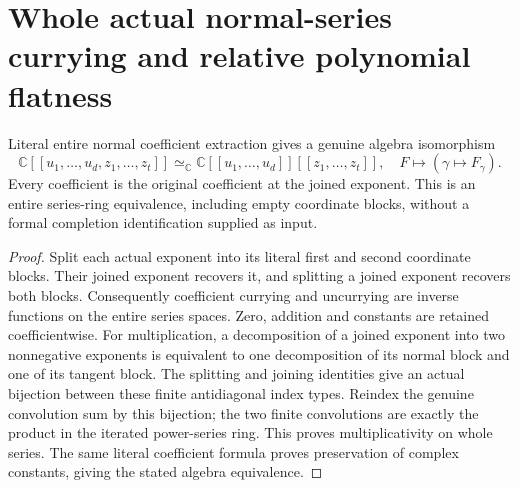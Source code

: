 \section{Whole actual normal-series currying and relative polynomial flatness}

\begin{theorem}
\label{hir:actual-whole-formal-normal-series-equivalence}
\leanok
Literal entire normal coefficient extraction gives a genuine algebra
isomorphism
\[
 \mathbb C[[u_1,\ldots,u_d,z_1,\ldots,z_t]]
 \simeq_{\mathbb C}
 \mathbb C[[u_1,\ldots,u_d]][[z_1,\ldots,z_t]],
 \quad F\longmapsto(\gamma\mapsto F_\gamma).
\]
Every coefficient is the original coefficient at the joined exponent.
This is an entire series-ring equivalence, including empty coordinate
blocks, without a formal completion identification supplied as input.
\end{theorem}
\begin{proof}
Split each actual exponent into its literal first and second coordinate
blocks. Their joined exponent recovers it, and splitting a joined
exponent recovers both blocks. Consequently coefficient currying and
uncurrying are inverse functions on the entire series spaces.
Zero, addition and constants are retained coefficientwise. For
multiplication, a decomposition of a joined exponent into two
nonnegative exponents is equivalent to one decomposition of its
normal block and one of its tangent block. The splitting and joining
identities give an actual bijection between these finite antidiagonal
index types. Reindex the genuine convolution sum by this bijection;
the two finite convolutions are exactly the product in the iterated
power-series ring. This proves multiplicativity on whole series.
The same literal coefficient formula proves preservation of complex
constants, giving the stated algebra equivalence.
\end{proof}

